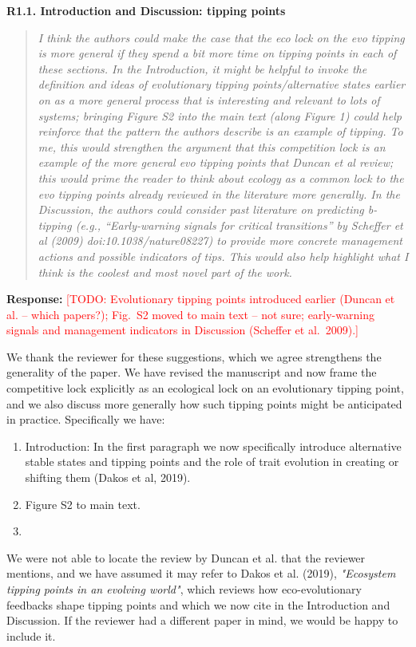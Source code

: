 \documentclass[11pt]{article}
\newenvironment{revcomment}[1]
  {\par\medskip\noindent\textbf{#1}\par\begin{quote}\itshape\color{commentgrey}}
  {\end{quote}}
\newcommand{\response}{\par\noindent\textbf{Response:} }
\newcommand{\todo}[1]{\textcolor{red}{[TODO: #1]}}
\begin{document}
\begin{revcomment}{R1.1. Introduction and Discussion: tipping points}
I think the authors could make the case that the eco lock on the evo tipping is more general if they spend a bit more time on tipping points in each of these sections. In the Introduction, it might be helpful to invoke the definition and ideas of evolutionary tipping points/alternative states earlier on as a more general process that is interesting and relevant to lots of systems; bringing Figure S2 into the main text (along Figure 1) could help reinforce that the pattern the authors describe is an example of tipping. To me, this would strengthen the argument that this competition lock is an example of the more general evo tipping points that Duncan et al review; this would prime the reader to think about ecology as a common lock to the evo tipping points already reviewed in the literature more generally. In the Discussion, the authors could consider past literature on predicting b-tipping (e.g., ``Early-warning signals for critical transitions'' by Scheffer et al (2009) doi:10.1038/nature08227) to provide more concrete management actions and possible indicators of tips. This would also help highlight what I think is the coolest and most novel part of the work.
\end{revcomment}

\response \todo{Evolutionary tipping points introduced earlier (Duncan et al. -- which papers?); Fig.~S2 moved to main text -- not sure; early-warning signals and management indicators in Discussion (Scheffer et al.\ 2009).}

We thank the reviewer for these suggestions, which we agree strengthens the generality of the paper. We have revised the manuscript and now frame the competitive lock explicitly as an ecological lock on an evolutionary tipping point, and we also discuss more generally how such tipping points might be anticipated in practice. Specifically we have:
\begin{enumerate}
    \item Introduction: In the first paragraph we now specifically introduce alternative stable states and tipping points and the role of trait evolution in creating or shifting them (Dakos et al, 2019).
    \item Figure S2 to main text.
    \item
\end{enumerate}

We were not able to locate the review by Duncan et al. that the reviewer mentions, and we have assumed it may refer to Dakos et al. (2019), \emph{"Ecosystem tipping points in an evolving world"}, which reviews how eco-evolutionary feedbacks shape tipping points and which we now cite in the Introduction and Discussion. If the reviewer had a different paper in mind, we would be happy to include it.
\end{document}
